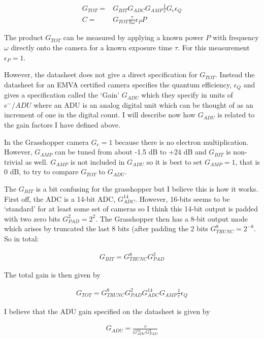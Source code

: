\documentclass[12pt]{article}
\newcommand{\ep}{\epsilon}
\begin{document}
\begin{align}
G_{TOT} =& G_{BIT} G_{ADC} G_{AMP}\frac{1}{c} G_{e}\ep_Q\\
C =& G_{TOT} \frac{\tau}{\hbar \omega} \ep_P P
\end{align}

The product $G_{TOT}$ can be measured by applying a known power $P$ with frequency $\omega$ directly onto the camera for a known exposure time $\tau$.
For this measurement $\ep_P = 1$.

However, the datasheet does not give a direct specification for $G_{TOT}$.
Instead the datasheet for an EMVA certified camera specifies the quantum efficiency, $\ep_Q$ and gives a specification called the `Gain' $G_{ADU}$ which they specify in units of $e^- / ADU$ where an ADU is an analog digital unit which can be thought of as an increment of one in the digital count.
I will describe now how $G_{ADU}$ is related to the gain factors I have defined above.

In the Grasshopper camera $G_e = 1$ because there is no electron multiplication.
However, $G_{AMP}$ can be tuned from about -1.5 dB to +24 dB and $G_{BIT}$ is non-trivial as well.
$G_{AMP}$ is not included in $G_{ADU}$ so it is best to set $G_{AMP} = 1$, that is 0 dB, to try to compare $G_{TOT}$ to $G_{ADU}$.

The $G_{BIT}$ is a bit confusing for the grasshopper but I believe this is how it works.
First off, the ADC is a 14-bit ADC, $G_{ADC}^{14}$. 
However, 16-bits seems to be `standard' for at least some set of cameras so I think this 14-bit output is padded with two zero bits $G_{PAD}^2 = 2^2$.
The Grasshopper then has a 8-bit output mode which arises by truncated the last 8 bits (after padding the 2 bits $G_{TRUNC}^8 = 2^{-8}$.
So in total:

\begin{align}
G_{BIT} = G_{TRUNC}^8 G_{PAD}^2
\end{align}

The total gain is then given by 

\begin{align}
G_{TOT} = G_{TRUNC}^8 G_{PAD}^2 G_{ADC}^{14}G_{AMP} \frac{1}{c} \ep_Q
\end{align}

I believe that the ADU gain specified on the datasheet is given by

\begin{align}
G_{ADU} = \frac{c}{G_{ADC}^{14}G_{PAD}^2}
\end{align}
\end{document}
